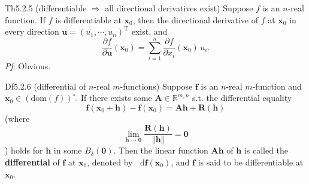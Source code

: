 \documentclass{article}
\newcommand{\parfrac}[2]{\frac{\partial #1}{\partial #2}}
\newcommand{\dif}{\mathop{}\!\mathrm{d}}
\begin{document}
\begin{Th}{Th5.2.5 (differentiable $\Rightarrow$ all directional derivatives exist)}
    Suppose $f$ is an $n$-real function. If $f$ is differentiable at $\pmb{x}_0$, then the directional derivative of $f$ at $\pmb{x}_0$ in every direction $\pmb{u} = (u_1, \cdots, u_n)^\mathrm{T}$ exist, and
    $$ \parfrac{f}{\pmb{u}}(\pmb{x}_0) = \sum_{i=1}^{n} \parfrac{f}{x_i}(\pmb{x}_0)\,u_i. $$
    \tcblower
    \textit{Pf}: Obvious.
\end{Th}

\begin{Df}{Df5.2.6 (differential of $n$-real $m$-functions)}
    Suppose $\pmb{f}$ is an $n$-real $m$-function and $\pmb{x}_0\in (\text{dom}(f))^\circ$. If there exists some $\pmb{A}\in\mathbb{R}^{m,n}$ s.t. the differential equality
    $$ \pmb{f}(\pmb{x}_0 + \pmb{h}) - \pmb{f}(\pmb{x}_0) = \pmb{Ah} + \pmb{R}(\pmb{h}) $$
    (where 
    $$\lim_{\pmb{h}\to \pmb{0}}\frac{\pmb{R}(\pmb{h})}{\Vert \pmb{h}\Vert} = \pmb{0} $$
    ) holds for $\pmb{h}$ in some $B_\delta(\pmb{0})$. Then the linear function $\pmb{Ah}$ of $\pmb{h}$ is called the \textbf{differential} of $\pmb{f}$ at $\pmb{x}_0$, denoted by $\dif \pmb{f}(\pmb{x}_0)$, and $\pmb{f}$ is said to be differentiable at $\pmb{x}_0$.
\end{Df}
\end{document}
